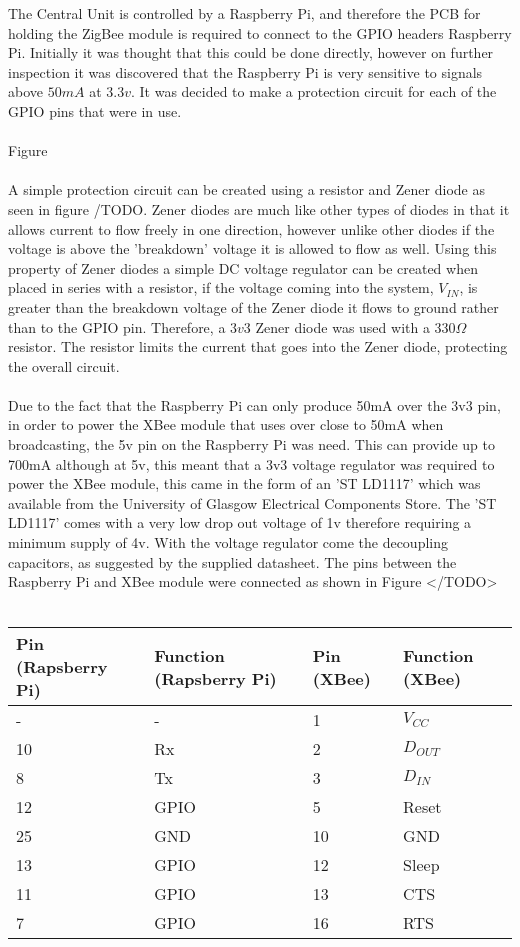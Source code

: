 The Central Unit is controlled by a Raspberry Pi, and therefore the PCB for holding the ZigBee module is required to connect to the GPIO headers Raspberry Pi.  Initially it was thought that this could be done directly, however on further inspection it was discovered that the Raspberry Pi is very sensitive to signals above \(50mA\) at \(3.3v\). It was decided to make a protection circuit for each of the GPIO pins that were in use. \\\\
Figure \\\\
A simple protection circuit can be created using a resistor and Zener diode as seen in figure /TODO.  Zener diodes are much like other types of diodes in that it allows current to flow freely in one direction, however unlike other diodes if the voltage is above the 'breakdown' voltage it is allowed to flow as well. Using this property of Zener diodes a simple DC voltage regulator can be created when placed in series with a resistor, if the voltage coming into the system, \(V_{IN}\), is greater than the breakdown voltage of the Zener diode it flows to ground rather than to the GPIO pin. Therefore, a \(3v3\) Zener diode was used with a \(330\Omega\) resistor. The resistor limits the current that goes into the Zener diode, protecting the overall circuit.
\\\\
Due to the fact that the Raspberry Pi can only produce 50mA over the 3v3 pin, in order to power the XBee module that uses over close to 50mA when broadcasting, the 5v pin on the Raspberry Pi was need. This can provide up to 700mA although at 5v, this meant that a 3v3 voltage regulator was required to power the XBee module, this came in the form of an 'ST LD1117' which was available from the University of Glasgow Electrical Components Store. The 'ST LD1117' comes with a very low drop out voltage of 1v therefore requiring a minimum supply of 4v. With the voltage regulator come the decoupling capacitors, as suggested by the supplied datasheet.
The pins between the Raspberry Pi and XBee module were connected as shown in Figure </TODO>
\\\\

\begin{center}
  \begin{tabular}{| l | l | l | l |}
    \hline
    \bf{Pin (Rapsberry Pi)} & \bf{Function (Rapsberry Pi)} & \bf{Pin (XBee)} & \bf{Function (XBee)} \\ \hline
     - & - & 1 & \(V_{CC}\) \\ \hline
	10 & Rx & 2 & \(D_{OUT}\) \\ \hline
	8 & Tx & 3 & \(D_{IN}\) \\ \hline
	12 & GPIO & 5 & Reset \\ \hline
	25 & GND & 10 & GND \\ \hline
	13 & GPIO & 12 & Sleep \\ \hline
	11 & GPIO & 13 & CTS \\ \hline
	7 & GPIO & 16 & RTS \\ \hline
    \hline
  \end{tabular}
\end{center}


